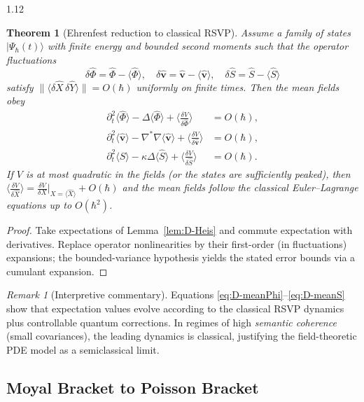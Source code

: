 \documentclass[12pt,a4paper]{article}
\numberwithin{equation}{section}
\newtheorem{theorem}{Theorem}[section]
\theoremstyle{remark}
\newtheorem{remark}{Remark}[section]
\theoremstyle{definition}
\begin{document}
\begin{spacing}{1.12}
\begin{theorem}[Ehrenfest reduction to classical RSVP]\label{thm:D-ehrenfest}
Assume a family of states $|\Psi_\hbar(t)\rangle$ with finite energy and bounded second moments such that the operator fluctuations
\[
\delta\hat{\Phi}=\hat{\Phi}-\langle\hat{\Phi}\rangle,\quad
\delta\hat{\mathbf{v}}=\hat{\mathbf{v}}-\langle\hat{\mathbf{v}}\rangle,\quad
\delta\hat{S}=\hat{S}-\langle\hat{S}\rangle
\]
satisfy $\|\langle \delta\hat{X}\,\delta\hat{Y}\rangle\|=O(\hbar)$ uniformly on finite times. Then the mean fields obey
\begin{align}
\partial_t^2 \langle \hat{\Phi}\rangle - \Delta \langle \hat{\Phi}\rangle + \Big\langle \frac{\delta V}{\delta \hat{\Phi}}\Big\rangle &= O(\hbar), \label{eq:D-meanPhi}\\
\partial_t^2 \langle \hat{\mathbf{v}}\rangle - \nabla^\ast\nabla \langle \hat{\mathbf{v}}\rangle + \Big\langle \frac{\delta V}{\delta \hat{\mathbf{v}}}\Big\rangle &= O(\hbar), \label{eq:D-meanv}\\
\partial_t^2 \langle \hat{S}\rangle - \kappa \Delta \langle \hat{S}\rangle + \Big\langle \frac{\delta V}{\delta \hat{S}}\Big\rangle &= O(\hbar). \label{eq:D-meanS}
\end{align}
If $V$ is at most quadratic in the fields (or the states are sufficiently peaked), then
$\big\langle \frac{\delta V}{\delta \hat{X}}\big\rangle = \frac{\delta V}{\delta X}\big|_{X=\langle\hat{X}\rangle}+O(\hbar)$ and the mean fields follow the classical Euler--Lagrange equations up to $O(\hbar^2)$.
\end{theorem}

\begin{proof}
Take expectations of Lemma~\ref{lem:D-Heis} and commute expectation with derivatives. Replace operator nonlinearities by their first-order (in fluctuations) expansions; the bounded-variance hypothesis yields the stated error bounds via a cumulant expansion.
\end{proof}

\begin{remark}[Interpretive commentary]
Equations \eqref{eq:D-meanPhi}–\eqref{eq:D-meanS} show that expectation values evolve according to the classical RSVP dynamics plus controllable quantum corrections. In regimes of high \emph{semantic coherence} (small covariances), the leading dynamics is classical, justifying the field-theoretic PDE model as a semiclassical limit.
\end{remark}

\subsection{Moyal Bracket to Poisson Bracket}\label{sec:D-moyal}


\end{spacing}
\end{document}
